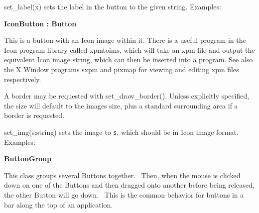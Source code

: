 set\_label(x) sets the label in the button to the given string.
Examples:


{\sffamily\bfseries
{}IconButton : Button}

This is a button with an Icon image within it. There is a useful program
in the Icon program library called xpmtoims, which will take an xpm
file and output the equivalent Icon image string, which can then be
inserted into a program. See also the X Window programs sxpm and pixmap
for viewing and editing xpm files respectively.

A border may be requested with set\_draw\_border(). Unless explicitly
specified, the size will default to the image{\textquotesingle}s size,
plus a standard surrounding area if a border is requested.

set\_img(s:string) sets the image to \texttt{s}, which should be in Icon
image format. Examples:


{\sffamily\bfseries
{}ButtonGroup}

This class groups several Buttons together. \ Then, when the mouse is
clicked down on one of the Buttons and then dragged onto another before
being released, the other Button will go
{\textquotedbl}down{\textquotedbl}. \ This is the common behavior for
buttons in a bar along the top of an application.

